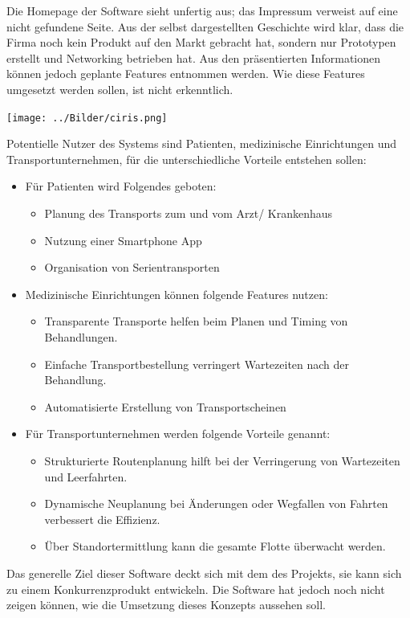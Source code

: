 \documentclass[a4paper, ngerman, 12pt]{scrartcl}
\begin{document}
Die Homepage der Software sieht unfertig aus; das Impressum verweist auf eine nicht gefundene Seite. Aus der selbst dargestellten Geschichte wird klar, dass die Firma noch kein Produkt auf den Markt gebracht hat, sondern nur Prototypen erstellt und Networking betrieben hat. Aus den präsentierten Informationen können jedoch geplante Features entnommen werden. Wie diese Features umgesetzt werden sollen, ist nicht erkenntlich.\\
\begin{center}
\begin{minipage}{0.8\textwidth}
	\centering
	\texttt{[image: ../Bilder/ciris.png]}
	\label{img:ciris}
\end{minipage}
\end{center}
Potentielle Nutzer des Systems sind Patienten, medizinische Einrichtungen und Transportunternehmen, für die unterschiedliche Vorteile entstehen sollen:
\begin{itemize}
\item Für Patienten wird Folgendes geboten:
\begin{itemize}
\item Planung des Transports zum und vom Arzt/ Krankenhaus
\item Nutzung einer Smartphone App
\item Organisation von Serientransporten
\end{itemize}
\item Medizinische Einrichtungen können folgende Features nutzen:
\begin{itemize}
\item Transparente Transporte helfen beim Planen und Timing von Behandlungen.
\item Einfache Transportbestellung verringert Wartezeiten nach der Behandlung.
\item Automatisierte Erstellung von Transportscheinen
\end{itemize}
\item Für Transportunternehmen werden folgende Vorteile genannt:
\begin{itemize}
\item Strukturierte Routenplanung hilft bei der Verringerung von Wartezeiten und Leerfahrten.
\item Dynamische Neuplanung bei Änderungen oder Wegfallen von Fahrten verbessert die Effizienz.
\item Über Standortermittlung kann die gesamte Flotte überwacht werden.
\end{itemize}
\end{itemize}
Das generelle Ziel dieser Software deckt sich mit dem des Projekts, sie kann sich zu einem Konkurrenzprodukt entwickeln. Die Software hat jedoch noch nicht zeigen können, wie die Umsetzung dieses Konzepts aussehen soll.
\end{document}
